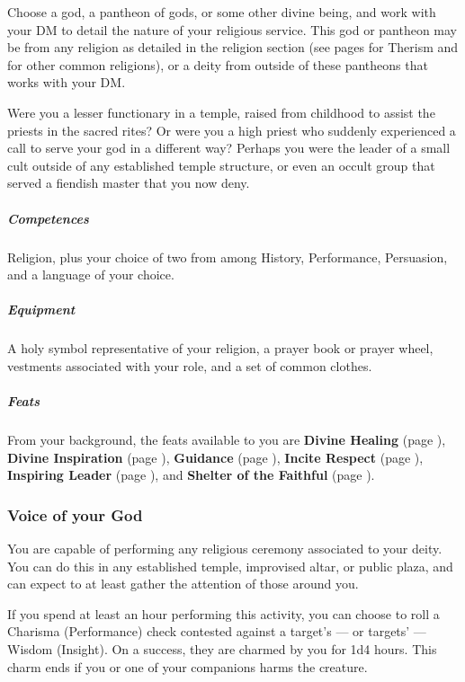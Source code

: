     Choose a god, a pantheon of gods, or some other divine being, and work with your DM to detail the nature of your religious service.
    This god or pantheon may be from any religion as detailed in the religion section (see pages \pageref{ssec::therism} for Therism and \pageref{ssec::religions} for other common religions), or a deity from outside of these pantheons that works with your DM.

    Were you a lesser functionary in a temple, raised from childhood to assist the priests in the sacred rites?
    Or were you a high priest who suddenly experienced a call to serve your god in a different way?
    Perhaps you were the leader of a small cult outside of any established temple structure, or even an occult group that served a fiendish master that you now deny.


    \subparagraph{Competences} Religion, plus your choice of two from among History, Performance, Persuasion, and a language of your choice.

    \subparagraph{Equipment} A holy symbol representative of your religion, a prayer book or prayer wheel, vestments associated with your role, and a set of common clothes.

    \subparagraph{Feats} From your background, the feats available to you are
    \textbf{Divine Healing} (page \pageref{feat::divinehealing}),
    \textbf{Divine Inspiration} (page \pageref{feat::divineinspiration}),
    \textbf{Guidance} (page \pageref{feat::guidance}),
    \textbf{Incite Respect} (page \pageref{feat::inciterespect}),
    \textbf{Inspiring Leader} (page \pageref{feat::inspiringleader}), and
    \textbf{Shelter of the Faithful} (page \pageref{feat::shelterofthefaithful}).

    \subsubsection{Voice of your God} \label{feat::voiceofyourgod}
        You are capable of performing any religious ceremony associated to your deity.
        You can do this in any established temple, improvised altar, or public plaza, and can expect to at least gather the attention of those around you.

        If you spend at least an hour performing this activity, you can choose to roll a Charisma (Performance) check contested against a target's --- or targets' --- Wisdom (Insight).
        On a success, they are charmed by you for 1d4 hours.
        This charm ends if you or one of your companions harms the creature.

